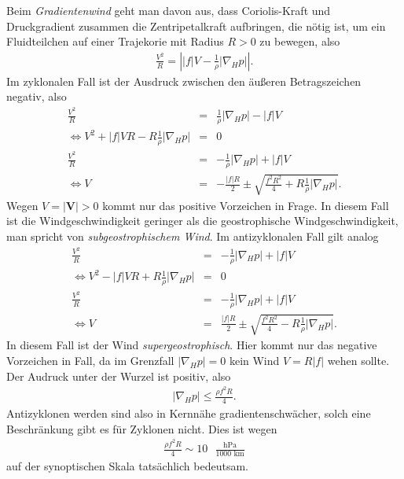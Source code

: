 \documentclass{book}
\begin{document}
Beim \textit{Gradientenwind} geht man davon aus, dass Coriolis-Kraft und Druckgradient zusammen die Zentripetalkraft aufbringen, die nötig ist, um ein Fluidteilchen auf einer Trajekorie mit Radius $R > 0$ zu bewegen, also
%
\begin{eqnarray}
\frac{V^2}{R} = \left|\left|f\right|V - \frac{1}{\rho}\left|\nabla_Hp\right|\right|.
\end{eqnarray}
%
Im zyklonalen Fall ist der Ausdruck zwischen den äußeren Betragszeichen negativ, also
%
\begin{eqnarray}
\frac{V^2}{R} & = & \frac{1}{\rho}\left|\nabla_Hp\right| - \left|f\right|V\nonumber\\
\Leftrightarrow V^2 + \left|f\right|VR - R\frac{1}{\rho}\left|\nabla_Hp\right| & = & 0 \nonumber\\
\frac{V^2}{R} & = & -\frac{1}{\rho}\left|\nabla_Hp\right| + \left|f\right|V\nonumber\\
\Leftrightarrow V & = & -\frac{\left|f\right|R}{2} \pm \sqrt{\frac{f^2R^2}{4} + R\frac{1}{\rho}\left|\nabla_Hp\right|}.
\end{eqnarray}
%
Wegen $V = \left|\mathbf{V}\right| > 0$ kommt nur das positive Vorzeichen in Frage. In diesem Fall ist die Windgeschwindigkeit geringer als die geostrophische Windgeschwindigkeit, man spricht von \textit{subgeostrophischem Wind}. Im antizyklonalen Fall gilt analog
%
\begin{eqnarray}
\frac{V^2}{R} & = & -\frac{1}{\rho}\left|\nabla_Hp\right| + \left|f\right|V\nonumber\\
\Leftrightarrow V^2 - \left|f\right|VR + R\frac{1}{\rho}\left|\nabla_Hp\right| & = & 0 \nonumber\\
\frac{V^2}{R} & = & -\frac{1}{\rho}\left|\nabla_Hp\right| + \left|f\right|V\nonumber\\
\Leftrightarrow V & = & \frac{\left|f\right|R}{2} \pm \sqrt{\frac{f^2R^2}{4} - R\frac{1}{\rho}\left|\nabla_Hp\right|}.
\end{eqnarray}
%
In diesem Fall ist der Wind \textit{supergeostrophisch}. Hier kommt nur das negative Vorzeichen in Fall, da im Grenzfall $\left|\nabla_Hp\right| = 0$ kein Wind $V = R\left|f\right|$ wehen sollte. Der Audruck unter der Wurzel ist positiv, also
%
\begin{eqnarray}
\left|\nabla_Hp\right| \leq \frac{\rho f^2R}{4}.
\end{eqnarray}
%
Antizyklonen werden sind also in Kernnähe gradientenschwächer, solch eine Beschränkung gibt es für Zyklonen nicht. Dies ist wegen
%
\begin{eqnarray}
\frac{\rho f^2R}{4} \sim 10\text{ }\frac{\text{hPa}}{\text{1000 km}}
\end{eqnarray}
%
auf der synoptischen Skala tatsächlich bedeutsam.
\end{document}
